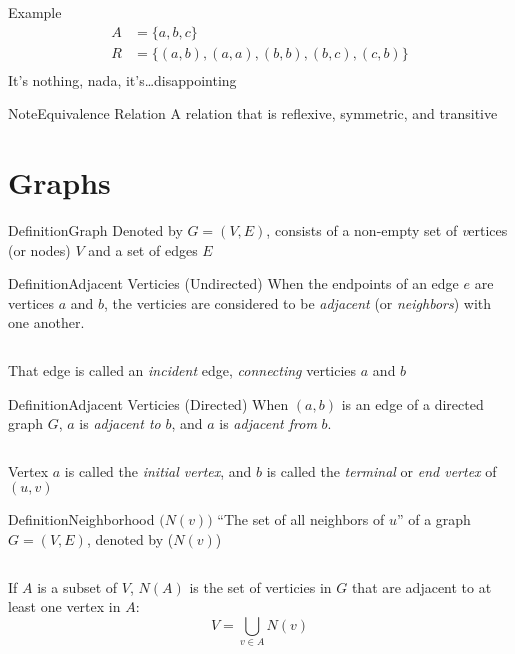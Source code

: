 \documentclass{MathNotes}
\newenvironment{example}[1]{\begin{BlueBox}{Example}{#1}}{\end{BlueBox}}
\newenvironment{definition}[1]{\begin{RedBox}{Definition}{#1}}{\end{RedBox}}
\newenvironment{note}[1]{\begin{YellowBox}{Note}{#1}}{\end{YellowBox}}
\newcommand{\bl}{
	\newline$ $\newline
}
\begin{document}
\begin{example}{}
	\begin{align*}
		A & = \{a,b,c\}                         \\
		R & = \{(a,b),(a,a),(b,b),(b,c),(c,b)\} \\
	\end{align*}
	It's nothing, nada, it's\ldots disappointing
\end{example}

\begin{note}{Equivalence Relation}
	A relation that is reflexive, symmetric, and transitive
\end{note}

\newpage
\section{Graphs}
\begin{definition}{Graph}
	Denoted by $G=(V,E)$, consists of a non-empty set of \textit vertices (or nodes) $V$ and a set of edges $E$
\end{definition}
\begin{multicols}{2}
    \begin{definition}{Adjacent Verticies (Undirected)}
    When the endpoints of an edge $e$ are vertices $a$ and $b$, the verticies
    are considered to be \textit{adjacent} (or \textit{neighbors}) with one
    another. 
    \bl
    That edge is called an \textit{incident} edge, \textit{connecting} verticies
    $a$ and $b$
\end{definition}
    \begin{definition}{Adjacent Verticies (Directed)}
        When $(a,b)$ is an edge of a directed graph $G$, $a$ is \textit{adjacent to}
        $b$, and $a$ is \textit{adjacent from} $b$.
        \bl
        Vertex $a$ is called the \textit{initial vertex}, and $b$ is called
        the \textit{terminal} or \textit{end vertex} of $(u,v)$
    \end{definition}
\end{multicols}

\begin{definition}{Neighborhood $\big(N(v)\big)$}
    ``The set of all neighbors of $u$'' of a graph $G=(V,E)$, denoted by ($N(v)$)
    \bl
    If $A$ is a subset of $V$, $N(A)$ is the set of verticies in $G$ that are
    adjacent to at least one vertex in $A$: \[V=\bigcup_{v\in A}N(v)\]
\end{definition}
\end{document}
